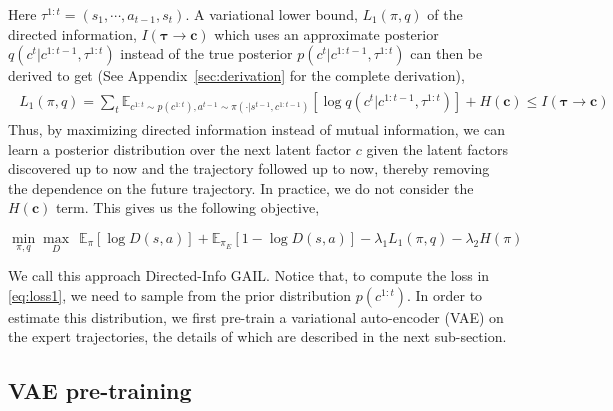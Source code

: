 \documentclass{article} %
\begin{document}
Here $\tau^{1:t} = (s_1, \cdots, a_{t-1}, s_{t})$. A variational lower bound, $L_{1}(\pi, q)$ of the directed information,  $I(\boldsymbol{\tau} \rightarrow \boldsymbol{c})$ which uses an approximate posterior $q(c^{t}|c^{1:t-1}, \tau^{1:t})$ instead of the true posterior $p(c^{t}|c^{1:t-1}, \tau^{1:t})$ can then be derived to get (See Appendix~\ref{sec:derivation} for the complete derivation),
\begin{align}
\begin{split}
 L_{1}(\pi, q) = \sum_{t} \mathbb{E}_{c^{1:t} \sim p(c^{1:t}), a^{t-1} \sim \pi(\cdot | s^{t-1},c^{1:t-1})} \left[
 \log q(c^{t} | c^{1:t-1}, \tau^{1:t}) \right] + H(\boldsymbol{c}) \leq I(\boldsymbol{\tau} \rightarrow \boldsymbol{c})
\label{eq:loss1}
\end{split}
\end{align}
Thus, by maximizing directed information instead of mutual information, we can learn a posterior distribution over the next latent factor $c$ given the latent factors discovered up to now and the trajectory followed up to now, thereby removing the dependence on the future trajectory. In practice, we do not consider the $H(\boldsymbol{c})$ term. This gives us the following objective,

\begin{equation}
    \min_{\pi, q} \max_{D} ~~\mathbb{E}_{\pi} \left[\log D(s,a)\right] + \mathbb{E}_{\pi_E} \left[1-\log D(s,a)\right] -\lambda_{1}L_{1}(\pi, q) - \lambda_{2}H(\pi)
\label{eq:directed_info_loss}
\end{equation}

We call this approach Directed-Info GAIL. Notice that, to compute the loss in \eqref{eq:loss1}, we need to sample from the prior distribution $p(c^{1:t})$. In order to estimate this distribution, we first pre-train a variational auto-encoder (VAE) \citep{kingma2013auto} on the expert trajectories, the details of which are described in the next sub-section.

\subsection{VAE pre-training}
\end{document}
